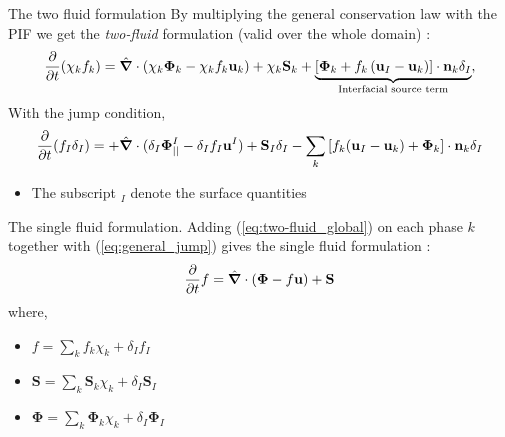 \documentclass{sintefbeamer}
\newcommand{\nablabh}{\hat{\bm{\nabla}}}
\begin{document}
\begin{frame}
  {The two fluid formulation}
  By multiplying the general conservation law with the PIF we get the \textit{two-fluid} formulation (valid over the whole domain) :
  \begin{equation}
    \pddt (\chi_k f_k)
    = \nablabh \cdot (\chi_k \bm{\Phi}_k - \chi_k f_k \textbf{u}_k)
    + \chi_k \textbf{S}_k
    + \underbrace{
    \left[
        \bm{\Phi}_k 
        + f_k 
        \left(
            \textbf{u}_I
            - \textbf{u}_k
        \right) 
    \right]
    \cdot \textbf{n}_k \delta_I }_{\text{Interfacial source term}},
    \label{eq:two-fluid_global}
\end{equation}
With the jump condition, 
\begin{equation}
  \pddt (f_I\delta_I)  
  = 
  + \nablabh \cdot (\delta_I \mathbf{\Phi}^I_{||} - \delta_I f_I \textbf{u}^I)
  +\textbf{S}_I \delta_I
  - \sum_k \left[
  f_k (\textbf{u}_I - \textbf{u}_k)
  + \mathbf{\Phi}_k
  \right] \cdot \textbf{n}_k \delta_I
  \label{eq:general_jump}
\end{equation}
\begin{itemize}
  \item The subscript $_I$ denote the surface quantities
\end{itemize}
\end{frame}

\begin{frame}{The single fluid formulation.}
  Adding (\ref{eq:two-fluid_global}) on each phase $k$ together with (\ref{eq:general_jump}) gives the single fluid formulation :
  \begin{equation}
    \pddt f
    = \nablabh \cdot (\bm{\Phi} - f \textbf{u})
    + \textbf{S}
    \label{eq:one-fluid_global}
\end{equation}
where,
\begin{itemize}
  \item $f = \sum_k f_k \chi_k + \delta_I f_I$ 
  \item $\textbf{S} = \sum_k \textbf{S}_k \chi_k + \delta_I \textbf{S}_I$
  \item $\bm{\Phi} = \sum_k \bm{\Phi}_k \chi_k+ \delta_I \mathbf{\Phi}_I$
\end{itemize}
\end{frame}
\end{document}
